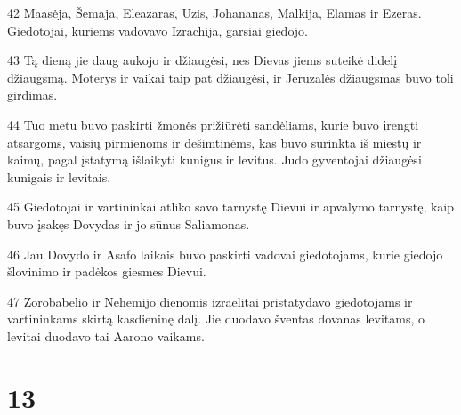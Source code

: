 \par 42 Maasėja, Šemaja, Eleazaras, Uzis, Johananas, Malkija, Elamas ir Ezeras. Giedotojai, kuriems vadovavo Izrachija, garsiai giedojo. 
\par 43 Tą dieną jie daug aukojo ir džiaugėsi, nes Dievas jiems suteikė didelį džiaugsmą. Moterys ir vaikai taip pat džiaugėsi, ir Jeruzalės džiaugsmas buvo toli girdimas. 
\par 44 Tuo metu buvo paskirti žmonės prižiūrėti sandėliams, kurie buvo įrengti atsargoms, vaisių pirmienoms ir dešimtinėms, kas buvo surinkta iš miestų ir kaimų, pagal įstatymą išlaikyti kunigus ir levitus. Judo gyventojai džiaugėsi kunigais ir levitais. 
\par 45 Giedotojai ir vartininkai atliko savo tarnystę Dievui ir apvalymo tarnystę, kaip buvo įsakęs Dovydas ir jo sūnus Saliamonas. 
\par 46 Jau Dovydo ir Asafo laikais buvo paskirti vadovai giedotojams, kurie giedojo šlovinimo ir padėkos giesmes Dievui. 
\par 47 Zorobabelio ir Nehemijo dienomis izraelitai pristatydavo giedotojams ir vartininkams skirtą kasdieninę dalį. Jie duodavo šventas dovanas levitams, o levitai duodavo tai Aarono vaikams.



\chapter{13}


